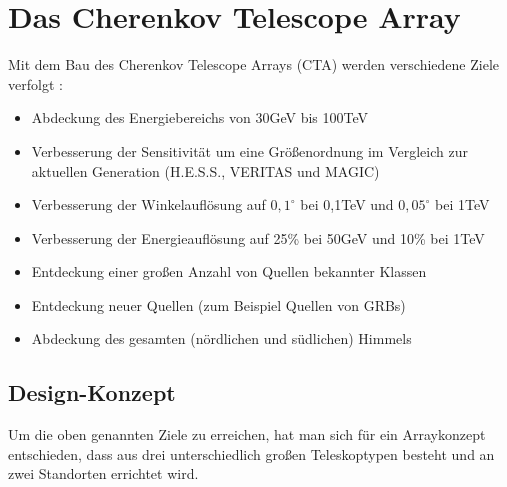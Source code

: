 \chapter{Das Cherenkov Telescope Array}
\label{ch:CTA}
Mit dem Bau des Cherenkov Telescope Arrays (CTA) werden verschiedene Ziele verfolgt \cite{NextGen}:
\begin{itemize}

\item Abdeckung des Energiebereichs von 30GeV bis 100TeV
\item Verbesserung der Sensitivität um eine Größenordnung im Vergleich zur aktuellen Generation (H.E.S.S., VERITAS und MAGIC)
\item Verbesserung der Winkelauflösung auf $0,1^{\circ}$ bei 0,1TeV und $0,05^{\circ}$ bei 1TeV
\item Verbesserung der Energieauflösung auf 25\% bei 50GeV und 10\% bei 1TeV
\item Entdeckung einer großen Anzahl von Quellen bekannter Klassen
\item Entdeckung neuer Quellen (zum Beispiel Quellen von GRBs)
\item Abdeckung des gesamten (nördlichen und südlichen) Himmels
\end{itemize}

\section{Design-Konzept}
Um die oben genannten Ziele zu erreichen, hat man sich für ein Arraykonzept entschieden, dass aus drei unterschiedlich großen Teleskoptypen besteht und an zwei Standorten errichtet wird.

